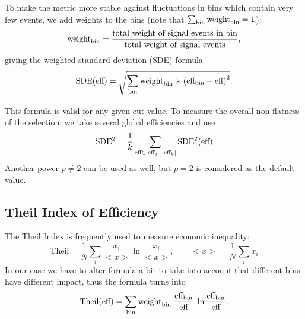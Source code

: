 To make the metric more stable against fluctuations in bins which contain very few events, we add weights to the bins (note that $\sum_{\text{bin}} \text{weight}_\text{bin} = 1$):
\[
	\text{weight}_\text{bin} = \dfrac{\text{total weight of signal events in bin}}
		{\text{total weight of signal events}},
\]
giving the weighted standard deviation (SDE) formula
\[
	\text{SDE}(\text{eff}) = 
	\sqrt{\sum_{\text{bin}} \text{weight}_\text{bin} \times \left(\text{eff}_\text{bin} - \text{eff} \right)^2}. 
\] 


This formula is valid for any given cut value. To measure the overall non-flatness of the selection, we
take several global efficiencies and use
\[
	\text{SDE}^2  =  \frac{1}{k} 
	\sum_{\text{eff} \in [\text{eff}_1 \dots \text{eff}_k] }  
		\text{SDE}^2(\text{eff})
\]
Another power $p \neq 2$ can be used as well, but $p=2$ is considered as the default value.
%
%

\subsection{Theil Index of Efficiency}
\def\theil{\text{Theil}}

The Theil Index is frequently used to measure economic inequality:
\[
	\theil = \frac{1}{N} \sum_i \frac{x_i}{<x>} \ln{\frac{x_i}{<x>}}, 
		\qquad <x> = \frac{1}{N} \sum_i x_i
\]
In our case we have to alter formula a bit to take into account that different bins have different impact, thus the formula turns into
\[
	\theil(\globaleff) = \sum_\bin \binweight \; \frac{\bineff}{\globaleff} \; \ln{\frac{\bineff}{\globaleff}}.
\]

